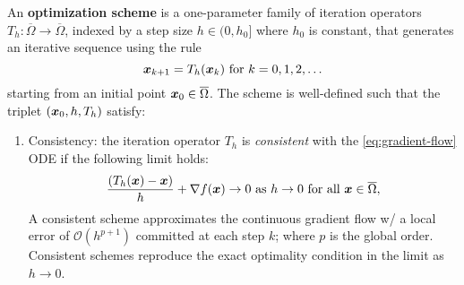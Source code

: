\documentclass[10pt]{article}
\begin{document}
        \begin{definition}
            An \textbf{optimization scheme} is a one-parameter family of iteration operators
            $T_h : \overline{\Omega} \rightarrow \overline{\Omega}$, indexed by a step size 
            $h \in (0, h_0]$ where $h_0$ is constant, that generates an iterative sequence using the rule
            \begin{equation}
                \label{eq:scheme}
                \bm{x}_{k+1} = T_h(\bm{x}_k) \text{ for } k = 0, 1, 2, \ldots
            \end{equation}
            starting from an initial point $\bm{x}_0 \in \overline{\Omega}$. The scheme is well-defined such that the 
            triplet $(\bm{x}_0, h, T_h)$ satisfy:
            \begin{enumerate}
                \item Consistency: the iteration operator $T_h$ is \emph{consistent} with the \eqref{eq:gradient-flow} ODE
                    if the following limit holds:
                    $$
                        \frac{\left(T_h(\bm{x}) - \bm{x}\right)}{h} + \nabla f(\bm{x}) \rightarrow 0 \text{ as } h \rightarrow 0
                        \text{ for all } \bm{x} \in \overline{\Omega},
                    $$
                    A consistent scheme approximates the continuous gradient flow w/ a local error of
                    $\mathcal{O}(h^{p+1})$ committed at each step $k$; where $p$ is the global order.
                    Consistent schemes reproduce the exact optimality condition in the limit as $h \to 0$.
   

\end{enumerate}
\end{definition}
\end{document}
